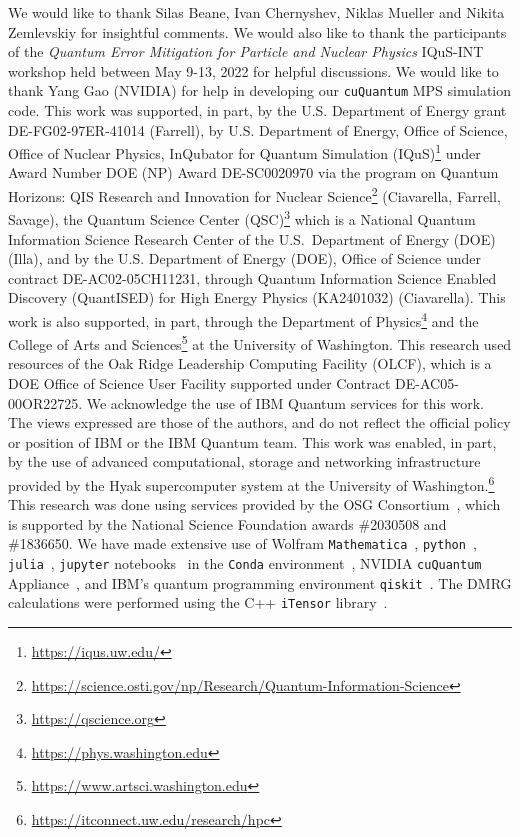 \documentclass[aps, prc, tightenlines,superscriptaddress, letterpaper, amsmath, amssymb, preprintnumbers, floatfix, longbibliography, nofootinbib]{revtex4-2}
\begin{document}
\begin{acknowledgements}
\noindent
We would like to thank Silas Beane, Ivan Chernyshev, Niklas Mueller and Nikita Zemlevskiy for insightful comments. 
We would also like to thank the participants of the {\it Quantum Error Mitigation for Particle and Nuclear Physics} IQuS-INT workshop held between May 9-13, 2022 for helpful discussions. We would like to thank Yang Gao (NVIDIA) for help in developing our {\tt cuQuantum} MPS simulation code.
This work was supported, in part, by the U.S. Department of Energy grant DE-FG02-97ER-41014 (Farrell), by U.S. Department of Energy, Office of Science, Office of Nuclear Physics, InQubator for Quantum Simulation (IQuS)\footnote{\url{https://iqus.uw.edu/}} under Award Number DOE (NP) Award DE-SC0020970 via the program on Quantum Horizons: QIS Research and Innovation for Nuclear Science\footnote{\url{https://science.osti.gov/np/Research/Quantum-Information-Science}} (Ciavarella, Farrell, Savage), the Quantum Science Center (QSC)\footnote{\url{https://qscience.org}} which is a National Quantum Information Science Research Center of the U.S.\ Department of Energy (DOE) (Illa), and by the U.S. Department of Energy (DOE), Office of Science under contract DE-AC02-05CH11231, through Quantum Information Science Enabled Discovery (QuantISED) for High Energy Physics (KA2401032) (Ciavarella).
This work is also supported, in part, through the Department of Physics\footnote{\url{https://phys.washington.edu}} and the College of Arts and Sciences\footnote{\url{https://www.artsci.washington.edu}} at the University of Washington.
This research used resources of the Oak Ridge Leadership Computing Facility (OLCF), which is a DOE Office of Science User Facility supported under Contract DE-AC05-00OR22725.
We acknowledge the use of IBM Quantum services for this work. The views expressed are those of the authors, and do not reflect the official policy or position of IBM or the IBM Quantum team. This work was enabled, in part, by the use of advanced computational, storage and networking infrastructure provided by the Hyak supercomputer system at the University of Washington.\footnote{\url{https://itconnect.uw.edu/research/hpc}}
This research was done using services provided by the OSG Consortium~\cite{osg07,osg09,osgweb,osgweb2}, which is supported by the National Science Foundation awards \#2030508 and \#1836650.
We have made extensive use of Wolfram {\tt Mathematica}~\cite{Mathematica}, {\tt python}~\cite{python3,Hunter:2007}, {\tt julia}~\cite{Julia-2017}, {\tt jupyter} notebooks~\cite{PER-GRA:2007} in the {\tt Conda} environment~\cite{anaconda}, NVIDIA {\tt cuQuantum} Appliance~\cite{cuquantum}, and IBM's quantum programming environment {\tt qiskit}~\cite{qiskit}. The DMRG calculations were performed using the C++ {\tt iTensor} library~\cite{fishman2022itensor}.
\end{acknowledgements}
\end{document}
